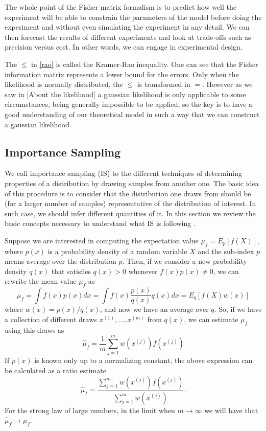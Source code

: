 \documentclass[onecolumn,           %
               showpacs,            %
               preprintnumbers,     %
               aps,                 %
               prl,          	    %
               letterpaper,             %
               superscriptaddress,      %
               nofootinbib,         %
               tightenlines,        %
               floats,floatfix      %
               ,usenatbib,
               ]{revtex4-1}
\begin{document}
The whole point of the Fisher matrix formalism is to predict how well the experiment will be able to constrain the parameters of the model before doing the experiment and without even simulating the experiment in any detail. We can then forecast the results of different experiments and look at trade-offs such as precision versus cost. In other words, we can engage in experimental design.

The $\leq$ in \eqref{rao} is called the Kramer-Rao inequality. One can see that the Fisher information matrix represents a lower bound for the errors. Only when the likelihood is normally distributed, the $\leq$ is transformed in $=$. However as we saw in [About the likelihood] a gaussian likelihood is only applicable to some circumstances, being generally impossible to be applied, so the key is to have a good understanding of our theoretical model in such a way that we can construct a gaussian likelihood.

\subsection{Importance Sampling}

We call importance sampling (IS) to the different techniques of determining properties of a distribution by drawing samples from another one. The basic idea of this procedure is to consider that the distribution one draws from should be (for a larger number of samples) representative of the distribution of interest. In such case, we should infer different quantities of it. In this section we review the basic concepts necessary to understand what IS is following \cite{importancesampling}.

Suppose we are interested in computing the expectation value $\mu_f=E_p[f(X)]$, where $p(x)$ is a probability density of a random variable $X$ and the sub-index $p$ means average over the distribution $p$. Then, if we consider a new probability density $q(x)$ that satisfies $q(x)>0$ whenever $f(x)p(x)\not = 0$, we can rewrite the mean value $\mu_f$ as
\begin{equation}
\mu_f = \int f(x)p(x)dx=\int f(x)\frac{p(x)}{q(x)}q(x)dx=E_q[f(X)w(x)]
\end{equation}
where $w(x)=p(x)/q(x)$, and now we have an average over $q$. So, if we have a collection of different draws $x^{(1)},...,x^{(m)}$ from $q(x)$, we can estimate $\mu_f$ using this draws as
\begin{equation}
\hat \mu_f = \frac{1}{m}\sum_{j=1}^m w(x^{(j)})f(x^{(j)})
\end{equation}
If $p(x)$ is known only up to a normalizing constant, the above expression can be calculated  as a ratio estimate
\begin{equation}
\hat \mu_f=\frac{\sum_{j=1}^m w(x^{(j)})f(x^{(j)})}{\sum_{j=1}^mw(x^{(j)})}.
\end{equation}
For the strong law of large numbers, in the limit when $m\rightarrow \infty$ we will have that $\hat \mu_f\rightarrow \mu_f$.
\end{document}

